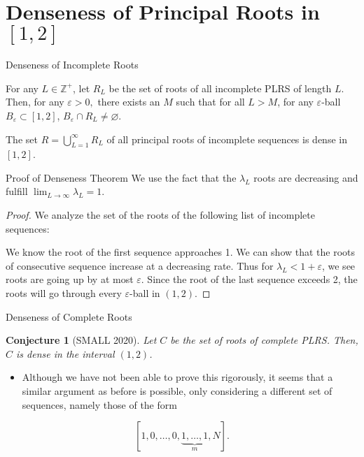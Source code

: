 \documentclass{beamer}
\newtheorem*{conjecture}{Conjecture}
\newcommand{\Z}{\mathbb{Z}}
\begin{document}
\section{Denseness of Principal Roots in $[1,2]$}
\begin{frame}{Denseness of Incomplete Roots}
	\begin{theorem}[SMALL 2020]
	For any $L\in \Z ^{+}$, let $R_{L}$ be the set of roots of all incomplete PLRS of length $L$. Then, for any $\varepsilon >0,$ there exists an $M$ such that for all $L>M$, for any $\varepsilon $-ball $B_{\varepsilon }\subset [ 1,2 ]$, $B_{\varepsilon }\cap R_{L}\neq \varnothing.$
\end{theorem}
\pause
\bigskip
\begin{corollary}
	The set $R=\bigcup _{L=1}^{\infty }R_{L}$ of all principal roots of incomplete sequences is dense in $[1,2]$.
\end{corollary} 

\end{frame}
\begin{frame}{Proof of Denseness Theorem}
We use the fact that the $\lambda _{L}$ roots are decreasing and fulfill $\lim_{L \rightarrow \infty }\lambda _{L}=1$.	
\pause
\begin{proof}
We analyze the set of the roots of the following list of incomplete sequences:
\begin{center}\end{center}
\pause
We know the root of the first sequence approaches 1. We can show that the roots of consecutive sequence increase at a decreasing rate. Thus for $\lambda _{L}<1+\varepsilon $, we see roots are going up by at most $\varepsilon $. Since the root of the last sequence exceeds 2, the roots will go through every $\varepsilon $-ball in $(1,2)$.
\end{proof}




\end{frame}

\begin{frame}{Denseness of Complete Roots}
\begin{conjecture}[SMALL 2020]
	Let $C$ be the set of roots of complete PLRS. Then, $C$ is dense in the interval $(1,2)$.
\end{conjecture}
\pause
\begin{itemize}
\item
Although we have not been able to prove this rigorously, it seems that a similar argument as before is possible, only considering a different set of sequences, namely those of the form 
\end{itemize}
\[
	[1,0,\ldots , 0,\underbrace{1,\ldots , 1}_{m},N]
.\] 


\end{frame}
\end{document}
